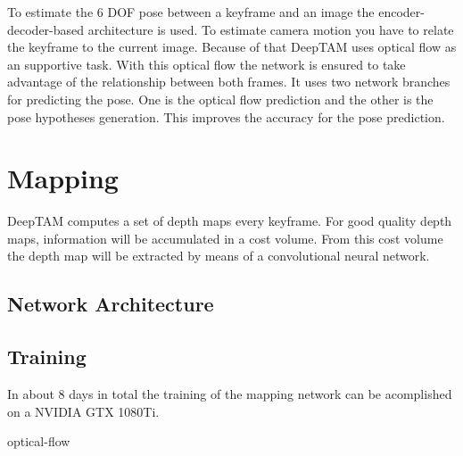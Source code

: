To estimate the 6 DOF pose between a keyframe and an image the encoder-decoder-based architecture is used. To estimate camera motion you have to relate the keyframe to the current image. Because of that DeepTAM uses optical flow as an supportive task. With this optical flow the network is ensured to take advantage of the relationship between both frames. It uses two network branches for predicting the pose. One is the optical flow prediction and the other is the pose hypotheses generation. This improves the accuracy for the pose prediction.

\section{Mapping}

DeepTAM computes a set of depth maps every keyframe. For good quality depth maps, information will be accumulated in a cost volume. From this cost volume the depth map will be extracted by means of a convolutional neural network.

\subsection{Network Architecture}

\subsection{Training}
In about 8 days in total the training of the mapping network can be acomplished on a NVIDIA GTX 1080Ti.

\gls{optical-flow}



